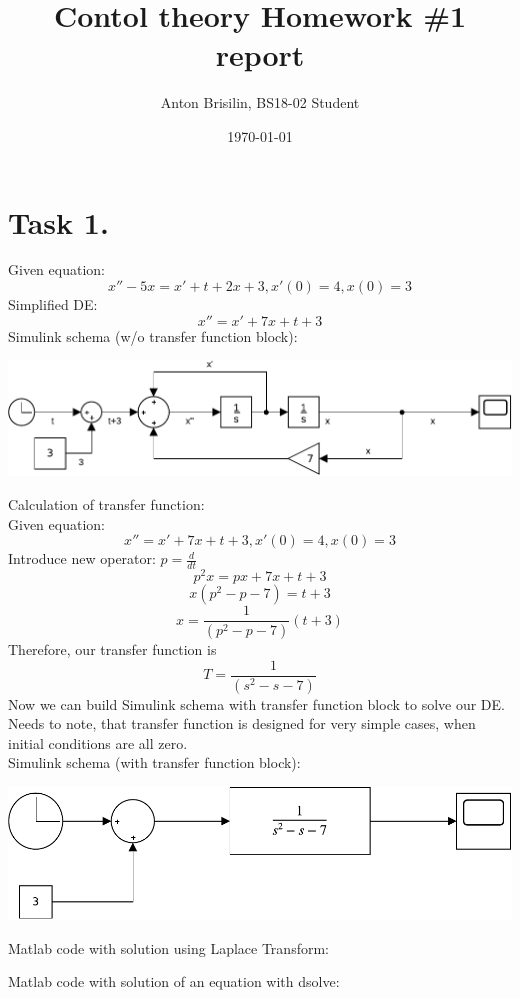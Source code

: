\documentclass[a4paper,12pt]{article}
\title{Contol theory Homework \#1 report}
\author{Anton Brisilin, BS18-02 Student}
\date{\today}
\begin{document}
\maketitle
\section{Task 1.}
Given equation:
$$x''-5x=x'+t+2x+3, x'(0)=4, x(0)=3$$
Simplified DE:
$$x''=x'+7x+t+3$$
Simulink schema (w/o transfer function block):
\begin{center}
    \includegraphics[width=\linewidth]{Schema1.pdf}
\end{center}
Calculation of transfer function:\\
Given equation:
$$x''=x'+7x+t+3, x'(0)=4, x(0)=3$$
Introduce new operator: $p=\frac{d}{dt}$
$$p^2x = px+7x+t+3$$
$$x(p^2-p-7)=t+3$$
$$x=\frac{1}{(p^2-p-7)}(t+3)$$
Therefore, our transfer function is 
$$T=\frac{1}{(s^2-s-7)}$$
Now we can build Simulink schema with transfer function 
block to solve our DE. Needs to note, that transfer 
function is designed for very simple cases, when initial 
conditions are all zero.\\
Simulink schema (with transfer function block):
\begin{center}
    \includegraphics[width=\linewidth]{Schema2.pdf}
\end{center}
Matlab code with solution using Laplace Transform:

Matlab code with solution of an equation with dsolve:

\end{document}
